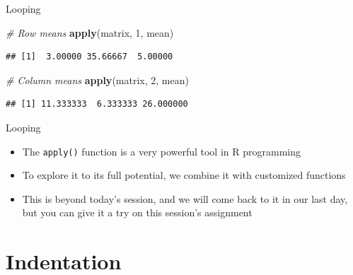 \documentclass[ignorenonframetext,]{beamer}
\newenvironment{Shaded}{\begin{snugshade}}{\end{snugshade}}
\newcommand{\KeywordTok}[1]{\textcolor[rgb]{0.13,0.29,0.53}{\textbf{#1}}}
\newcommand{\DecValTok}[1]{\textcolor[rgb]{0.00,0.00,0.81}{#1}}
\newcommand{\CommentTok}[1]{\textcolor[rgb]{0.56,0.35,0.01}{\textit{#1}}}
\newcommand{\NormalTok}[1]{#1}
\providecommand{\tightlist}{%
  \setlength{\itemsep}{0pt}\setlength{\parskip}{0pt}}
\begin{document}
\begin{frame}[fragile]{Looping}

\begin{Shaded}
\begin{Highlighting}[]
    \CommentTok{# Row means}
    \KeywordTok{apply}\NormalTok{(matrix, }\DecValTok{1}\NormalTok{, mean)}
\end{Highlighting}
\end{Shaded}

\begin{verbatim}
## [1]  3.00000 35.66667  5.00000
\end{verbatim}

\begin{Shaded}
\begin{Highlighting}[]
    \CommentTok{# Column means}
    \KeywordTok{apply}\NormalTok{(matrix, }\DecValTok{2}\NormalTok{, mean)}
\end{Highlighting}
\end{Shaded}

\begin{verbatim}
## [1] 11.333333  6.333333 26.000000
\end{verbatim}

\end{frame}

\begin{frame}[fragile]{Looping}

\begin{itemize}
\tightlist
\item
  The \texttt{apply()} function is a very powerful tool in R programming
\item
  To explore it to its full potential, we combine it with customized
  functions
\item
  This is beyond today's session, and we will come back to it in our
  last day, but you can give it a try on this session's assignment
\end{itemize}

\end{frame}

\section{Indentation}\label{indentation}
\end{document}
